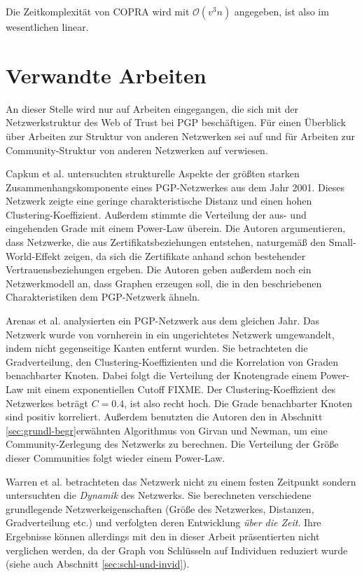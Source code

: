 Die Zeitkomplexität von COPRA wird mit $\mathcal{O}(v^3n)$
angegeben, ist also im wesentlichen linear.

\section{Verwandte Arbeiten}
\label{ch:Grundlagen:sec:RelatedWork}

An dieser Stelle wird nur auf Arbeiten eingegangen, die sich mit der
Netzwerkstruktur des Web of Trust bei PGP beschäftigen. Für einen
Überblick über Arbeiten zur Struktur von anderen Netzwerken sei
auf \cite{newman:167}und für Arbeiten zur Community-Struktur von
anderen Netzwerken auf \cite{Fortunato2010} verwiesen.

Capkun et al. \cite{Capkun2002} untersuchten strukturelle Aspekte der
größten starken Zusammenhangskomponente eines PGP-Netzwerkes aus
dem Jahr 2001. Dieses Netzwerk zeigte eine geringe charakteristische
Distanz und einen hohen Clustering-Koeffizient. Außerdem stimmte die
Verteilung der aus- und eingehenden Grade mit einem Power-Law
überein. Die Autoren argumentieren, dass Netzwerke, die aus
Zertifikatsbeziehungen entstehen, naturgemäß den Small-World-Effekt
zeigen, da sich die Zertifikate anhand schon bestehender
Vertrauensbeziehungen ergeben. Die Autoren geben außerdem noch ein
Netzwerkmodell an, dass Graphen erzeugen soll, die in den
beschriebenen Charakteristiken dem PGP-Netzwerk ähneln.

Arenas et al. \cite{Boguna2004} analysierten ein PGP-Netzwerk aus dem
gleichen Jahr. Das Netzwerk wurde von vornherein in ein ungerichtetes
Netzwerk umgewandelt, indem nicht gegenseitige Kanten entfernt
wurden. Sie betrachteten die Gradverteilung, den
Clustering-Koeffizienten und die Korrelation von Graden benachbarter
Knoten. Dabei folgt die Verteilung der Knotengrade einem Power-Law mit
einem exponentiellen Cutoff FIXME. Der Clustering-Koeffizient des
Netzwerkes beträgt $C=0.4$, ist also recht hoch. Die Grade
benachbarter Knoten sind positiv korreliert. Außerdem benutzten die
Autoren den in Abschnitt \ref{sec:grundl-begr}erwähnten Algorithmus
von Girvan und Newman, um eine Community-Zerlegung des Netzwerks zu
berechnen. Die Verteilung der Größe dieser Communities folgt wieder
einem Power-Law.

Warren et al. betrachteten das Netzwerk nicht zu einem festen
Zeitpunkt sondern untersuchten die \emph{Dynamik} des
Netzwerks\cite{Warren2007}. Sie berechneten verschiedene grundlegende
Netzwerkeigenschaften (Größe des Netzwerkes, Distanzen,
Gradverteilung etc.) und verfolgten deren Entwicklung \emph{über die
  Zeit}. Ihre Ergebnisse können allerdings mit den in dieser Arbeit
präsentierten nicht verglichen werden, da der Graph von Schlüsseln
auf Individuen reduziert wurde (siehe auch Abschnitt
\ref{sec:schl-und-invid}).

